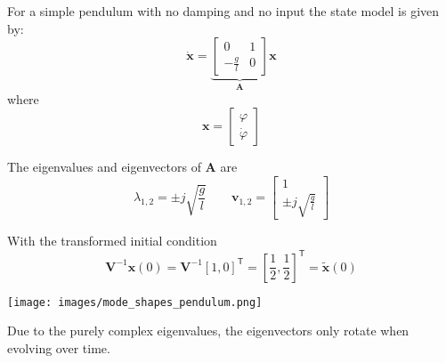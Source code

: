 \begin{examplesection}
    For a simple pendulum with no damping and no input the state model is given by:
    \begin{equation*}
        \dot{\mathbf{x}}=\underbrace{\begin{bmatrix}
                0            & 1 \\
                -\frac{g}{l} & 0
            \end{bmatrix}}_{\mathbf{A}}\mathbf{x}
    \end{equation*}
    where
    \begin{equation*}
        \mathbf{x}=\begin{bmatrix}
            \varphi \\
            \dot{\varphi}
        \end{bmatrix}
    \end{equation*}

    The eigenvalues and eigenvectors of $\mathbf{A}$ are
    \begin{equation*}
        \lambda_{1,2} = \pm j \sqrt{\frac{g}{l}} \qquad \mathbf{v}_{1,2}=\begin{bmatrix}
            1 \\
            \pm j \sqrt{\frac{g}{l}}
        \end{bmatrix}
    \end{equation*}

    With the transformed initial condition
    \noindent\begin{equation*}
        \mathbf{V}^{-1}\mathbf{x}(0) = \mathbf{V}^{-1}{[1, 0]}^{\mathsf{T}} = {\left[\frac{1}{2}, \frac{1}{2}\right]}^{\mathsf{T}} = \tilde{\mathbf{x}}(0)
    \end{equation*}

    \texttt{[image: images/mode\_shapes\_pendulum.png]}

    Due to the purely complex eigenvalues, the eigenvectors only rotate when evolving over time.


\end{examplesection}
